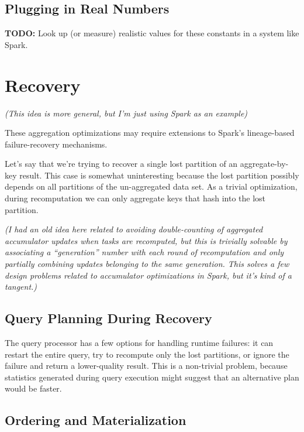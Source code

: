 \documentclass[12pt]{article}
\begin{document}
\subsection{Plugging in Real Numbers}

\textbf{TODO:} Look up (or measure) realistic values for these constants in
a system like Spark.









\pagebreak

\section{Recovery}

\emph{(This idea is more general, but I'm just using Spark as an example)}

These aggregation optimizations may require extensions to Spark's lineage-based failure-recovery mechanisms.

Let's say that we're trying to recover a single lost partition of an
aggregate-by-key result.  This case is somewhat uninteresting because the lost
partition possibly depends on all partitions of the un-aggregated data set.
As a trivial optimization, during recomputation we can only aggregate keys
that hash into the lost partition.

\emph{(I had an old idea here related to avoiding double-counting of
aggregated accumulator updates when tasks are recomputed, but this is
trivially solvable by associating a ``generation'' number with each round of
recomputation and only partially combining updates belonging to the same
generation.  This solves a few design problems related to accumulator
optimizations in Spark, but it's kind of a tangent.)}

\subsection{Query Planning During Recovery}

The query processor has a few options for handling runtime failures: it can
restart the entire query, try to recompute only the lost partitions, or ignore
the failure and return a lower-quality result.  This is a non-trivial problem,
because statistics generated during query execution might suggest that an
alternative plan would be faster.

\subsection{Ordering and Materialization}
\end{document}
